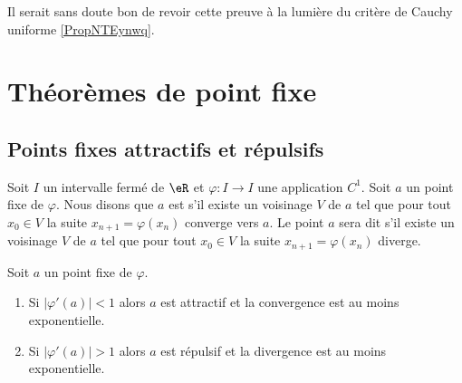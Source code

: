\begin{probleme}
Il serait sans doute bon de revoir cette preuve à la lumière du critère de Cauchy uniforme \ref{PropNTEynwq}.
\end{probleme}

\section{Théorèmes de point fixe}

\subsection{Points fixes attractifs et répulsifs}

\begin{definition}      \label{DEFooTMZUooMoBDGC}
    Soit \( I\) un intervalle fermé de \( \eR\) et \( \varphi\colon I\to I\) une application \( C^1\). Soit \( a\) un point fixe de \( \varphi\). Nous disons que \( a\) est  s'il existe un voisinage \( V\) de \( a\) tel que pour tout \( x_0\in V\) la suite \( x_{n+1}=\varphi(x_n)\) converge vers \( a\). Le point \( a\) sera dit  s'il existe un voisinage \( V\) de \( a\) tel que pour tout \( x_0\in V\) la suite \( x_{n+1}=\varphi(x_n)\) diverge.
\end{definition}

\begin{lemma}
    Soit \( a\) un point fixe de \( \varphi\).
    \begin{enumerate}
        \item
    Si \( | \varphi'(a) |<1\) alors \( a\) est attractif et la convergence est au moins exponentielle.
\item
    Si \( | \varphi'(a) |>1\) alors \( a\) est répulsif et la divergence est au moins exponentielle.
    \end{enumerate}
\end{lemma}

